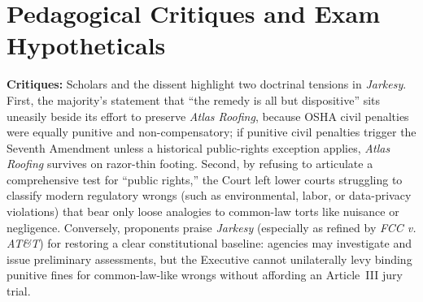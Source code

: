 \documentclass[12pt]{article}
\begin{document}
\section{Pedagogical Critiques and Exam Hypotheticals}
\textbf{Critiques:} Scholars and the dissent highlight two doctrinal tensions in \textit{Jarkesy}. First, the majority's statement that ``the remedy is all but dispositive'' sits uneasily beside its effort to preserve \textit{Atlas Roofing}, because OSHA civil penalties were equally punitive and non-compensatory; if punitive civil penalties trigger the Seventh Amendment unless a historical public-rights exception applies, \textit{Atlas Roofing} survives on razor-thin footing. Second, by refusing to articulate a comprehensive test for ``public rights,'' the Court left lower courts struggling to classify modern regulatory wrongs (such as environmental, labor, or data-privacy violations) that bear only loose analogies to common-law torts like nuisance or negligence. Conversely, proponents praise \textit{Jarkesy} (especially as refined by \textit{FCC v. AT\&T}) for restoring a clear constitutional baseline: agencies may investigate and issue preliminary assessments, but the Executive cannot unilaterally levy binding punitive fines for common-law-like wrongs without affording an Article~III jury trial.
\end{document}
